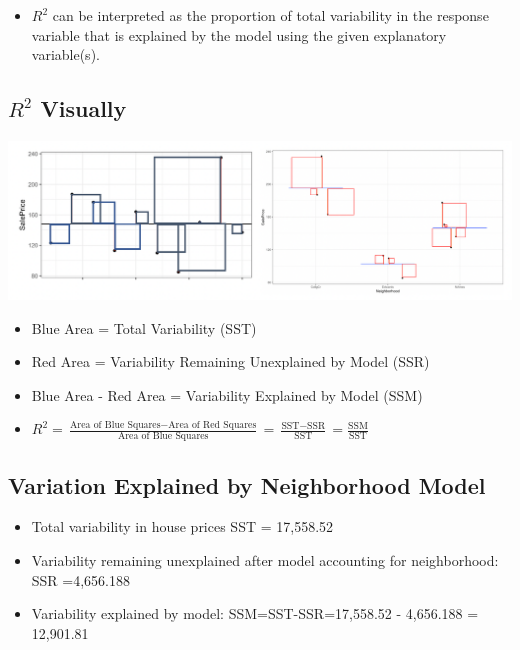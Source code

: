 \documentclass[]{book}
\providecommand{\tightlist}{%
  \setlength{\itemsep}{0pt}\setlength{\parskip}{0pt}}
\begin{document}
\begin{itemize}
\tightlist
\item
  \(R^2\) can be interpreted as the proportion of total variability in
  the response variable that is explained by the model using the given
  explanatory variable(s).
\end{itemize}

\subsection{\texorpdfstring{\(R^2\)
Visually}{R\^{}2 Visually}}\label{r2-visually}

\includegraphics[width=1\linewidth]{Rsq2}

\begin{itemize}
\item
  Blue Area = Total Variability (SST)
\item
  Red Area = Variability Remaining Unexplained by Model (SSR)
\item
  Blue Area - Red Area = Variability Explained by Model (SSM)
\item
  \(R^2 = \frac{\text{Area of Blue Squares} - \text{Area of Red Squares}}{\text{Area of Blue Squares}} = \frac{\text{SST}-\text{SSR}}{\text{SST}}= \frac{\text{SSM}}{\text{SST}}\)
\end{itemize}

\subsection{Variation Explained by Neighborhood
Model}\label{variation-explained-by-neighborhood-model}

\begin{itemize}
\tightlist
\item
  Total variability in house prices SST = 17,558.52\\
\item
  Variability remaining unexplained after model accounting for
  neighborhood: SSR =4,656.188\\
\item
  Variability explained by model: SSM=SST-SSR=17,558.52 - 4,656.188 =
  12,901.81
\end{itemize}
\end{document}
